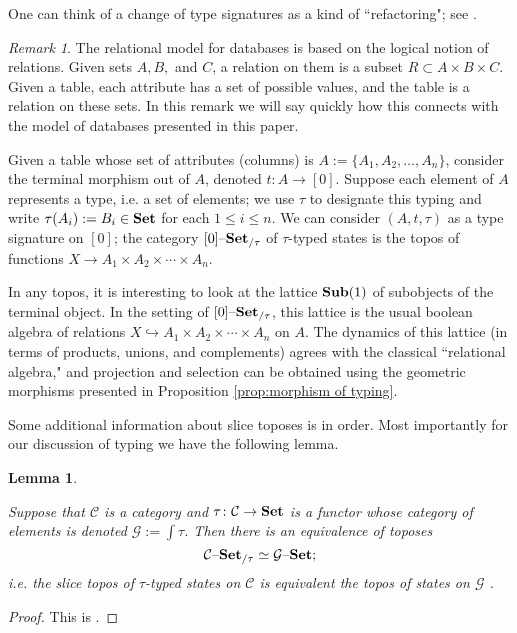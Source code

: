 \documentclass{amsart}
\def\mc{\mathcal}
\def\to{\rightarrow}
\def\cross{\times}
\def\taking{\colon}
\def\inj{\hookrightarrow}
\def\ss{\subset}
\def\Set{{\bf Set}}
\def\set{{\text \textendash}{\bf Set}}
\def\mcC{\mc{C}}
\def\mcG{\mc{G}}
\newtheorem{lemma}[theorem]{Lemma}
\theoremstyle{remark}
\newtheorem{remark}[theorem]{Remark}
\theoremstyle{definition}
\begin{document}
One can think of a change of type signatures as a kind of ``refactoring"; see \cite{F}.  

\begin{remark}

The relational model for databases is based on the logical notion of relations.  Given sets $A,B,$ and $C$, a relation on them is a subset $R\ss A\cross B\cross C$.  Given a table, each attribute has a set of possible values, and the table is a relation on these sets.  In this remark we will say quickly how this connects with the model of databases presented in this paper.

Given a table whose set of attributes (columns) is $A:=\{A_1,A_2,\ldots,A_n\}$, consider the terminal morphism out of $A$, denoted $t\taking A\to[0]$.   Suppose each element of $A$ represents a type, i.e. a set of elements; we use $\tau$ to designate this typing and write $\tau(A_i):=B_i\in\Set$ for each $1\leq i\leq n$.  We can consider $(A,t,\tau)$ as a type signature on $[0]$; the category $[0]\set_{/\tau}$ of $\tau$-typed states is the topos of functions $X\to A_1\cross A_2\cross\cdots\cross A_n$.  

In any topos, it is interesting to look at the lattice ${\bf Sub}(1)$ of subobjects of the terminal object.  In the setting of $[0]\set_{/\tau}$, this lattice is the usual boolean algebra of relations $X\inj A_1\cross A_2\cross\cdots\cross A_n$ on $A$.  The dynamics of this lattice (in terms of products, unions, and complements) agrees with the classical ``relational algebra," and projection and selection can be obtained using the geometric morphisms presented in Proposition \ref{prop:morphism of typing}.

\end{remark}

Some additional information about slice toposes is in order.  Most importantly for our discussion of typing we have the following lemma.

\begin{lemma}\label{lemma:slice presheaf topos}

Suppose that $\mcC$ is a category and $\tau\taking\mcC\to\Set$ is a functor whose category of elements is denoted $\mcG:=\int\tau$.  Then there is an equivalence of toposes $$\mcC\set_{/\tau}\simeq \mcG\set;$$ i.e. the slice topos of $\tau$-typed states on $\mcC$ is equivalent the topos of states on $\mcG$ .

\end{lemma}

\begin{proof}

This is \cite[A.1.1.7]{Joh}.

\end{proof}
\end{document}
